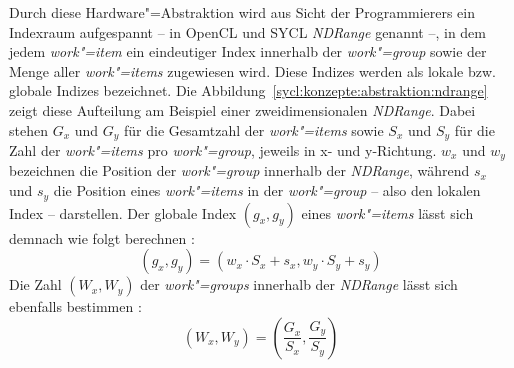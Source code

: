 Durch diese Hardware"=Abstraktion wird aus Sicht der Programmierers ein
Indexraum aufgespannt -- in OpenCL und SYCL \textit{NDRange} genannt --, in dem
jedem \textit{work"=item} ein eindeutiger Index innerhalb der
\textit{work"=group} sowie der Menge aller \textit{work"=items} zugewiesen wird.
Diese Indizes werden als lokale bzw. globale Indizes bezeichnet. Die
Abbildung~\ref{sycl:konzepte:abstraktion:ndrange} zeigt diese Aufteilung am
Beispiel einer zweidimensionalen \textit{NDRange}. Dabei stehen $G_x$ und 
$G_y$ für die Gesamtzahl der \textit{work"=items} sowie $S_x$ und $S_y$ für die
Zahl der \textit{work"=items} pro \textit{work"=group}, jeweils in x- und
y-Richtung. $w_x$ und $w_y$ bezeichnen die Position der \textit{work"=group}
innerhalb der \textit{NDRange}, während $s_x$ und $s_y$ die Position eines
\textit{work"=items} in der \textit{work"=group} -- also den lokalen Index --
darstellen. Der globale Index $(g_x, g_y)$ eines \textit{work"=items} lässt sich
demnach wie folgt berechnen \cite[vgl.][24]{opencl2012}:
\[
    (g_x, g_y) = (w_x \cdot S_x + s_x, w_y \cdot S_y + s_y)
\]
Die Zahl $(W_x, W_y)$ der \textit{work"=groups} innerhalb der \textit{NDRange}
lässt sich ebenfalls bestimmen \cite[vgl.][25]{opencl2012}:
\[
    (W_x, W_y) = \left(\frac{G_x}{S_x}, \frac{G_y}{S_y}\right)
\]

